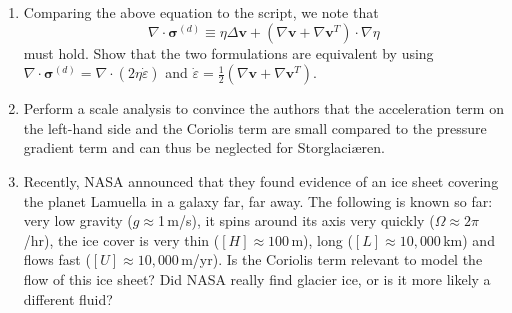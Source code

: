 \documentclass[parskip=half]{scrartcl}
\newcommand{\epsdot}{\dot{\varepsilon}}
\begin{document}
\begin{enumerate}
\item Comparing the above equation to the script, we note that $$\nabla \cdot \bm{\sigma}^{(d)} \equiv  \eta \Delta \bm{v} + \left( \nabla \bm{v} + \nabla \bm{v}^T\right) \cdot \nabla \eta $$ must hold. Show that the two formulations are equivalent by using $\nabla \cdot \bm{\sigma}^{(d)} = \nabla \cdot \left(2\eta \epsdot\right)$ and $\epsdot = \frac{1}{2}\left(\nabla \bm{v} + \nabla \bm{v}^{T}\right)$.
  
\item Perform a scale analysis to convince the authors that the acceleration term on the left-hand side and the Coriolis term are small compared to the pressure gradient term and can thus be neglected for Storglaci{\ae}ren. 

\item Recently, NASA announced that they found evidence of an ice sheet covering the planet Lamuella in a galaxy far, far away. The following is known so far: very low gravity ($g\approx$1\,m/s), it spins around its axis very quickly ($\Omega\approx 2\pi$/hr), the ice cover is very thin ($[H]\approx 100$\,m), long ($[L]\approx 10,000$\,km) and flows fast ($[U]\approx 10,000$\,m/yr). Is the Coriolis term relevant to model the flow of this ice sheet? Did NASA really find glacier ice, or is it more likely a different fluid?
\end{enumerate}


\end{document}
